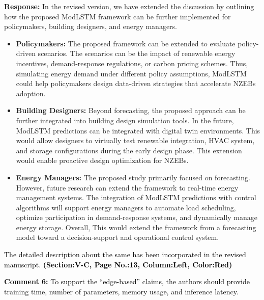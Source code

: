 \documentclass[12pt]{article}
\begin{document}
\hspace{-1.5em}\textbf{Response:} In the revised version, we have extended the discussion by outlining how the proposed ModLSTM framework can be further implemented for policymakers, building designers, and energy managers.\newline
\begin{itemize}
    \item \textbf{Policymakers:} The proposed framework can be extended to evaluate policy-driven scenarios. The scenarios can be the impact of renewable energy incentives, demand-response regulations, or carbon pricing schemes. Thus, simulating energy demand under different policy assumptions, ModLSTM could help policymakers design data-driven strategies that accelerate NZEBs adoption.\newline
\item \textbf{Building Designers:} Beyond forecasting, the proposed approach can be further integrated into building design simulation tools. In the future, ModLSTM predictions can be integrated with digital twin environments. This would allow designers to virtually test renewable integration, HVAC system, and storage configurations during the early design phase. This extension would enable proactive design optimization for NZEBs.\newline
\item \textbf{Energy Managers:} The proposed study primarily focused on forecasting. However, future research can extend the framework to real-time energy management systems. The integration of ModLSTM predictions with control algorithms will support energy managers to automate load scheduling, optimize participation in demand-response systems, and dynamically manage energy storage. Overall, This would extend the framework from a forecasting model toward a decision-support and operational control system.\newline
\end{itemize}

\noindent\textcolor{black}{The detailed description about the same
has been incorporated in the revised manuscript. \textbf{(Section:V-C, Page No.:13, Column:Left, Color:Red)}} \newline
\newline



\noindent\textcolor{black}{\noindent\textbf{Comment 6:} To support the “edge-based” claims, the authors should provide training time, number of parameters, memory usage, and inference latency.}
\vspace{0.15cm}
\end{document}
